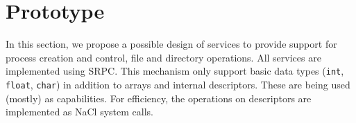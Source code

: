 \section{Prototype}
\label{sec:prototype}





In this section, we propose a possible design of services to provide
support for process creation and control, file and directory operations.
All services are implemented using SRPC. This mechanism only support
basic data types (\ie \lstinline`int`, \lstinline`float`,
\lstinline`char`) in addition to arrays and internal descriptors. These
are being used (mostly) as capabilities. For efficiency, the operations
on descriptors are implemented as NaCl system calls.


